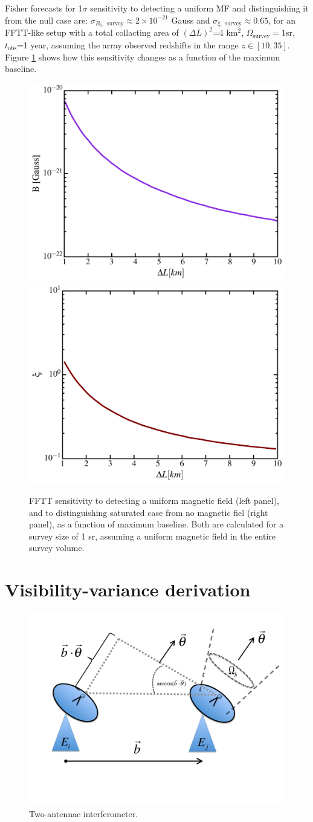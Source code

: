 \documentclass[12pt]{paper}
\begin{document}
Fisher forecasts for 1$\sigma$ sensitivity to detecting a uniform MF and distinguishing it from the null case are: $\sigma_{B_0,\text{ survey}}\approx 2\times 10^{-21}$ Gauss and $\sigma_{\xi,\text{ survey}}\approx 0.65$, for an FFTT-like setup with a total collacting area of $(\Delta L)^2$=4 km$^2$, $\Omega_\text{survey}=1$sr, $t_\text{obs}$=1 year, assuming the array observed redshifts in the range $z\in [10,35]$. Figure \ref{fig:B0zeta_vs_deltas} shows how this sensitivity changes as a function of the maximum baseline.
\begin{figure}
\centering
\includegraphics[width=.35\textwidth,keepaspectratio=true]{B0_vs_deltas.pdf}
\includegraphics[width=.35\textwidth,keepaspectratio=true]{zeta_vs_deltas.pdf}
\caption{FFTT sensitivity to detecting a uniform magnetic field (left panel), and to distinguishing saturated case from no magnetic fiel (right panel), as a function of maximum baseline. Both are calculated for a survey size of 1 sr, assuming a uniform magnetic field in the entire survey volume.\label{fig:B0zeta_vs_deltas}}
\end{figure}
\appendix
\section{Visibility-variance derivation}
\label{app_Vrms}

\begin{figure}
\centering
\includegraphics[width=.5\textwidth,keepaspectratio=true]{2antennae.pdf}
\caption{Two-antennae interferometer.\label{fig:2antennae}}
\end{figure}
\end{document}
